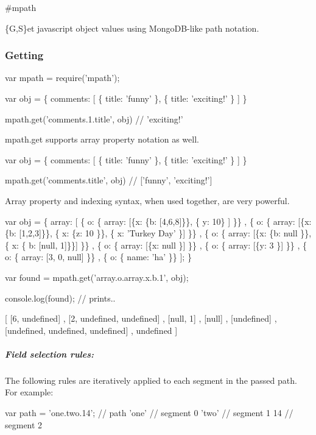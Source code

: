 \#mpath

\{G,S\}et javascript object values using Mongo\+D\+B-\/like path notation.

\subsubsection*{Getting}


\begin{DoxyCode}
var mpath = require('mpath');

var obj = \{
    comments: [
      \{ title: 'funny' \},
      \{ title: 'exciting!' \}
    ]
\}

mpath.get('comments.1.title', obj) // 'exciting!'
\end{DoxyCode}


{\ttfamily mpath.\+get} supports array property notation as well.


\begin{DoxyCode}
var obj = \{
    comments: [
      \{ title: 'funny' \},
      \{ title: 'exciting!' \}
    ]
\}

mpath.get('comments.title', obj) // ['funny', 'exciting!']
\end{DoxyCode}


Array property and indexing syntax, when used together, are very powerful.


\begin{DoxyCode}
var obj = \{
  array: [
      \{ o: \{ array: [\{x: \{b: [4,6,8]\}\}, \{ y: 10\} ] \}\}
    , \{ o: \{ array: [\{x: \{b: [1,2,3]\}\}, \{ x: \{z: 10 \}\}, \{ x: 'Turkey Day' \}] \}\}
    , \{ o: \{ array: [\{x: \{b: null \}\}, \{ x: \{ b: [null, 1]\}\}] \}\}
    , \{ o: \{ array: [\{x: null \}] \}\}
    , \{ o: \{ array: [\{y: 3 \}] \}\}
    , \{ o: \{ array: [3, 0, null] \}\}
    , \{ o: \{ name: 'ha' \}\}
  ];
\}

var found = mpath.get('array.o.array.x.b.1', obj);

console.log(found); // prints..

    [ [6, undefined]
    , [2, undefined, undefined]
    , [null, 1]
    , [null]
    , [undefined]
    , [undefined, undefined, undefined]
    , undefined
    ]
\end{DoxyCode}


\subparagraph*{Field selection rules\+:}

The following rules are iteratively applied to each {\ttfamily segment} in the passed {\ttfamily path}. For example\+:


\begin{DoxyCode}
var path = 'one.two.14'; // path
'one' // segment 0
'two' // segment 1
14    // segment 2
\end{DoxyCode}



